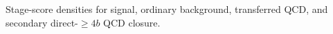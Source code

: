 Stage-score densities for signal, ordinary background, transferred QCD, and secondary direct-$\geq4b$ QCD closure.
